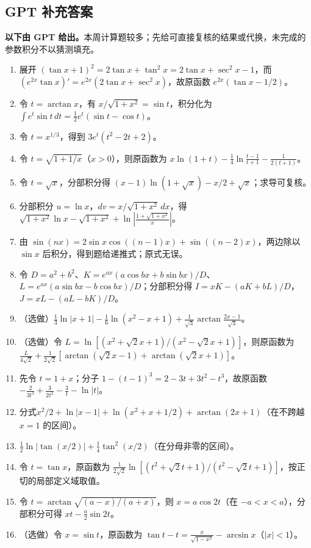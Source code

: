 \documentclass[UTF8,11pt, a4paper, oneside, fontset=none]{ctexbook}
\begin{document}
\subsection*{GPT 补充答案}

\noindent\textbf{以下由 GPT 给出。}本周计算题较多；先给可直接复核的结果或代换，未完成的参数积分不以猜测填充。
\begin{enumerate}
\item 展开 $(\tan x+1)^2=2\tan x+\tan^2x=2\tan x+\sec^2x-1$，而 $(e^{2x}\tan x)'=e^{2x}(2\tan x+\sec^2x)$，故原函数 $e^{2x}(\tan x-1/2)$。
\item 令 $t=\arctan x$，有 $x/\sqrt{1+x^2}=\sin t$，积分化为 $\int e^t\sin t\,dt=\frac12e^t(\sin t-\cos t)$。
\item 令 $t=x^{1/3}$，得到 $3e^t(t^2-2t+2)$。
\item 令 $t=\sqrt{1+1/x}$（$x>0$），则原函数为 $x\ln(1+t)-\frac14\ln\frac{t-1}{t+1}-\frac1{2(t+1)}$。
\item 令 $t=\sqrt x$，分部积分得 $(x-1)\ln(1+\sqrt x)-x/2+\sqrt x$；求导可复核。
\item 分部积分 $u=\ln x$，$dv=x/\sqrt{1+x^2}\,dx$，得 $\sqrt{1+x^2}\ln x-\sqrt{1+x^2}+\ln\left|\frac{1+\sqrt{1+x^2}}x\right|$。
\item 由 $\sin(nx)=2\sin x\cos((n-1)x)+\sin((n-2)x)$，两边除以 $\sin x$ 后积分，得到题给递推式；原式无误。
\item 令 $D=a^2+b^2$、$K=e^{ax}(a\cos bx+b\sin bx)/D$、$L=e^{ax}(a\sin bx-b\cos bx)/D$；分部积分得 $I=xK-(aK+bL)/D$，$J=xL-(aL-bK)/D$。
\item（选做）$\frac13\ln|x+1|-\frac16\ln(x^2-x+1)+\frac1{\sqrt3}\arctan\frac{2x-1}{\sqrt3}$。
\item（选做）令 $L=\ln[(x^2+\sqrt2x+1)/(x^2-\sqrt2x+1)]$，则原函数为 $\frac{L}{4\sqrt2}+\frac1{2\sqrt2}[\arctan(\sqrt2x-1)+\arctan(\sqrt2x+1)]$。
\item 先令 $t=1+x$；分子 $1-(t-1)^3=2-3t+3t^2-t^3$，故原函数 $-\frac2{3t^3}+\frac3{2t^2}-\frac3t-\ln|t|$。
\item 分式$x^2/2+\ln|x-1|+\ln(x^2+x+1/2)+\arctan(2x+1)$（在不跨越 $x=1$ 的区间）。
\item $\frac12\ln|\tan(x/2)|+\frac14\tan^2(x/2)$（在分母非零的区间）。
\item 令 $t=\tan x$，原函数为 $\frac1{2\sqrt2}\ln[(t^2+\sqrt2t+1)/(t^2-\sqrt2t+1)]$，按正切的局部定义域取值。
\item 令 $t=\arctan\sqrt{(a-x)/(a+x)}$，则 $x=a\cos2t$（在 $-a<x<a$），分部积分可得 $xt-\frac a2\sin2t$。
\item（选做）令 $x=\sin t$，原函数为 $\tan t-t=\frac{x}{\sqrt{1-x^2}}-\arcsin x$（$|x|<1$）。

\end{enumerate}
\end{document}
